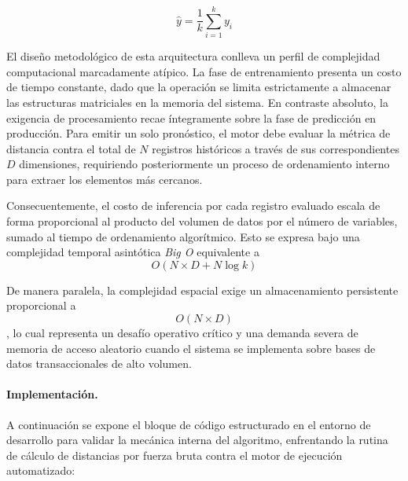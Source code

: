 \documentclass[11pt,a4paper]{report}
\begin{document}
            $$\hat{y}=\frac{1}{k}\sum_{i=1}^{k}y_i$$

            El diseño metodológico de esta arquitectura conlleva un perfil de complejidad computacional marcadamente atípico.
            La fase de entrenamiento presenta un costo de tiempo constante, dado que la operación se limita estrictamente a almacenar
            las estructuras matriciales en la memoria del sistema. En contraste absoluto, la exigencia de procesamiento recae íntegramente sobre
            la fase de predicción en producción. Para emitir un solo pronóstico, el motor debe evaluar la métrica de distancia contra el total de $N$
            registros históricos a través de sus correspondientes $D$ dimensiones, requiriendo posteriormente un proceso de ordenamiento
            interno para extraer los elementos más cercanos.

            Consecuentemente, el costo de inferencia por cada registro evaluado escala de forma proporcional al producto del
            volumen de datos por el número de variables, sumado al tiempo de ordenamiento algorítmico. Esto se expresa bajo una
            complejidad temporal asintótica \textit{Big O} equivalente a $$O(N \times D + N \log k)$$
            
            De manera paralela, la complejidad espacial exige un almacenamiento persistente proporcional a $$O(N \times D)$$,
            lo cual representa un desafío operativo crítico y una demanda severa de memoria de acceso aleatorio cuando el sistema
            se implementa sobre bases de datos transaccionales de alto volumen.

        \paragraph{Implementación.}
        A continuación se expone el bloque de código estructurado en el entorno de desarrollo para validar
        la mecánica interna del algoritmo, enfrentando la rutina de cálculo de distancias por fuerza bruta contra el motor de ejecución automatizado:
\end{document}
